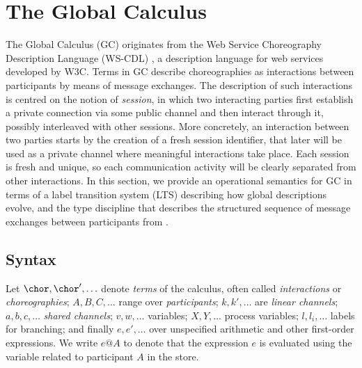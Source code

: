 \section{The Global Calculus}\label{Logic4Struct:sec:globalCalc}

The Global Calculus (GC) \cite{CHY:dcm2006,carbone7scc} originates
from the Web Service Choreography Description Language (WS-CDL)
\cite{kavantzas2004web}, a description language for web services
developed by W3C. Terms in GC describe choreographies as interactions
between participants by means of message exchanges. The description of
such interactions is centred on the notion of \emph{session}, in
which two interacting parties first establish a private connection via
some public channel and then interact through it, possibly interleaved
with other sessions. More concretely, an interaction between two
parties starts by the creation of a fresh session identifier, that
later will be used as a private channel where meaningful interactions
take place. Each session is fresh and unique, so each communication
activity will be clearly separated from other interactions. In this
section, we provide an operational semantics for GC in terms of a
label transition system (LTS) \cite{plotkin81structural} describing
how global descriptions evolve, and the type discipline that describes
the structured sequence of message exchanges between participants from
\cite{carbone7scc}.

\subsection{Syntax}

Let $\chor, \chor', \ldots$ denote {\em terms} of the calculus, often
called {\em interactions} or {\em choreographies}; $A, B, C, \ldots$
range over {\em participants}; $k,k', \ldots$ are {\em linear
  channels}; $a,b,c,\ldots$ {\em shared channels}; $v,w,\ldots$
variables; $X,Y,\ldots$ process variables; $l,l_i,\ldots$ labels for
branching; and finally $e, e', \ldots$ over unspecified arithmetic and
other first-order expressions. We write $e@A$ to denote that the
expression $e$ is evaluated using the variable related to participant
$A$ in the store.

